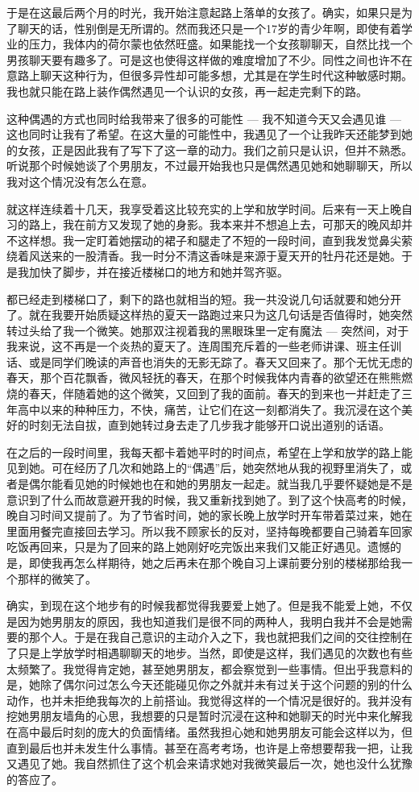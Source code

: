 \documentclass[UTF8,oneside]{ctexbook}
\begin{document}
于是在这最后两个月的时光，我开始注意起路上落单的女孩了。确实，如果只是为了聊天的话，性别倒是无所谓的。然而我还只是一个17岁的青少年啊，即使有着学业的压力，我体内的荷尔蒙也依然旺盛。如果能找一个女孩聊聊天，自然比找一个男孩聊天要有趣多了。可是这也使得这样做的难度增加了不少。同性之间也许不在意路上聊天这种行为，但很多异性却可能多想，尤其是在学生时代这种敏感时期。我也就只能在路上装作偶然遇见一个认识的女孩，再一起走完剩下的路。

这种偶遇的方式也同时给我带来了很多的可能性 --- 我不知道今天又会遇见谁 --- 这也同时让我有了希望。在这大量的可能性中，我遇见了一个让我昨天还能梦到她的女孩，正是因此我有了写下了这一章的动力。我们之前只是认识，但并不熟悉。听说那个时候她谈了个男朋友，不过最开始我也只是偶然遇见她和她聊聊天，所以我对这个情况没有怎么在意。

就这样连续着十几天，我享受着这比较充实的上学和放学时间。后来有一天上晚自习的路上，我在前方又发现了她的身影。我本来并不想追上去，可那天的晚风却并不这样想。我一定盯着她摆动的裙子和腿走了不短的一段时间，直到我发觉鼻尖萦绕着风送来的一股清香。我一时分不清这香味是来源于夏天开的牡丹花还是她。于是我加快了脚步，并在接近楼梯口的地方和她并驾齐驱。

都已经走到楼梯口了，剩下的路也就相当的短。我一共没说几句话就要和她分开了。就在我要开始质疑这样热的夏天一路跑过来只为这几句话是否值得时，她突然转过头给了我一个微笑。她那双注视着我的黑眼珠里一定有魔法 --- 突然间，对于我来说，这不再是一个炎热的夏天了。连周围充斥着的一些老师讲课、班主任训话、或是同学们晚读的声音也消失的无影无踪了。春天又回来了。那个无忧无虑的春天，那个百花飘香，微风轻抚的春天，在那个时候我体内青春的欲望还在熊熊燃烧的春天，伴随着她的这个微笑，又回到了我的面前。春天的到来也一并赶走了三年高中以来的种种压力，不快，痛苦，让它们在这一刻都消失了。我沉浸在这个美好的时刻无法自拔，直到她转过身去走了几步我才能够开口说出道别的话语。

在之后的一段时间里，我每天都卡着她平时的时间点，希望在上学和放学的路上能见到她。可在经历了几次和她路上的``偶遇''后，她突然地从我的视野里消失了，或者是偶尔能看见她的时候她也在和她的男朋友一起走。就当我几乎要怀疑她是不是意识到了什么而故意避开我的时候，我又重新找到她了。到了这个快高考的时候，晚自习时间又提前了。为了节省时间，她的家长晚上放学时开车带着菜过来，她在里面用餐完直接回去学习。所以我不顾家长的反对，坚持每晚都要自己骑着车回家吃饭再回来，只是为了回来的路上她刚好吃完饭出来我们又能正好遇见。遗憾的是，即使我再怎么样期待，她之后再未在那个晚自习上课前要分别的楼梯那给我一个那样的微笑了。

确实，到现在这个地步有的时候我都觉得我要爱上她了。但是我不能爱上她，不仅是因为她男朋友的原因，我也知道我们是很不同的两种人，我明白我并不会是她需要的那个人。于是在我自己意识的主动介入之下，我也就把我们之间的交往控制在了只是上学放学时相遇聊聊天的地步。当然，即使是这样，我们遇见的次数也有些太频繁了。我觉得肯定她，甚至她男朋友，都会察觉到一些事情。但出乎我意料的是，她除了偶尔问过怎么今天还能碰见你之外就并未有过关于这个问题的别的什么动作，也并未拒绝我每次的上前搭讪。我觉得这样的一个情况是很好的。我并没有挖她男朋友墙角的心思，我想要的只是暂时沉浸在这种和她聊天的时光中来化解我在高中最后时刻的庞大的负面情绪。虽然我担心她和她男朋友可能会这样以为，但直到最后也并未发生什么事情。甚至在高考考场，也许是上帝想要帮我一把，让我又遇见了她。我自然抓住了这个机会来请求她对我微笑最后一次，她也没什么犹豫的答应了。
\end{document}

